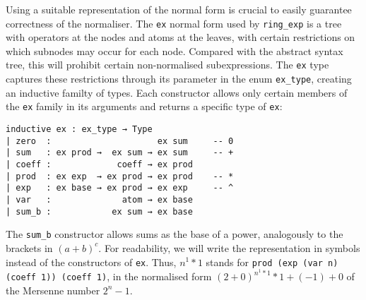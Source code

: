 \documentclass{llncs}
\newcommand{\lean}[1]{\texttt{#1}\xspace} %
\newcommand{\ex}{\lean{ex}}
\newcommand{\ring}{\lean{ring}}
\newcommand{\ringexp}{\lean{ring\_exp}}
\begin{document}
Using a suitable representation of the normal form is crucial to easily guarantee correctness of the normaliser.
The \ex normal form used by \ringexp is a tree with operators at the nodes and atoms at the leaves,
with certain restrictions on which subnodes may occur for each node.
Compared with the abstract syntax tree, this will prohibit certain non-normalised subexpressions.
The \ex type captures these restrictions through its parameter in the enum \lean{ex\_type},
creating an inductive familty of types.
Each constructor allows only certain members of the \ex family in its arguments
and returns a specific type of \ex:

\begin{lstlisting}
inductive ex : ex_type → Type
| zero  :                     ex sum     -- 0
| sum   : ex prod →  ex sum → ex sum     -- +
| coeff :             coeff → ex prod
| prod  : ex exp  → ex prod → ex prod    -- *
| exp   : ex base → ex prod → ex exp     -- ^
| var   :              atom → ex base
| sum_b :            ex sum → ex base
\end{lstlisting}

The \lean{sum\_b} constructor allows sums as the base of a power, analogously to the brackets in $(a + b) ^ c$.
For readability, we will write the representation in symbols instead of the constructors of \ex.
Thus, $n^1 * 1$ stands for \lean{prod (exp (var n) (coeff 1)) (coeff 1)},
in the normalised form $(2+0)^{n^1 * 1} * 1 + (-1) + 0$ of the Mersenne number $2^n - 1$.
\end{document}
